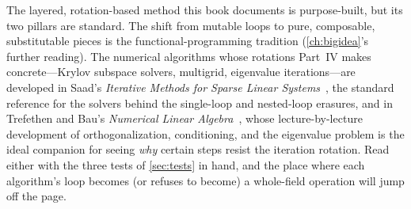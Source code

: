 \furtherreading
The layered, rotation-based method this book documents is purpose-built, but its
two pillars are standard. The shift from mutable loops to pure, composable,
substitutable pieces is the functional-programming tradition (\cref{ch:bigidea}'s
further reading). The numerical algorithms whose rotations Part~IV makes
concrete---Krylov subspace solvers, multigrid, eigenvalue iterations---are
developed in Saad's \emph{Iterative Methods for Sparse Linear
Systems}~\citep{saad2003}, the standard reference for the solvers behind the
single-loop and nested-loop erasures, and in Trefethen and Bau's \emph{Numerical
Linear Algebra}~\citep{trefethenbau1997}, whose lecture-by-lecture development of
orthogonalization, conditioning, and the eigenvalue problem is the ideal companion
for seeing \emph{why} certain steps resist the iteration rotation. Read either with
the three tests of \cref{sec:tests} in hand, and the place where each algorithm's
loop becomes (or refuses to become) a whole-field operation will jump off the page.

